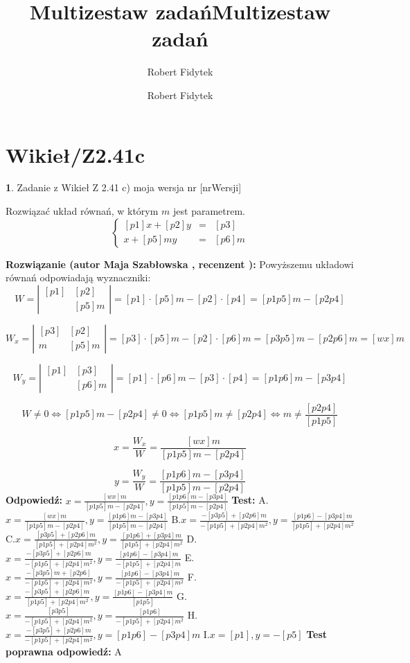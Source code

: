 \documentclass[12pt, a4paper]{article}
\title{Multizestaw zadań}
\author{Robert Fidytek}
\date{}\documentclass[12pt, a4paper]{article}
\title{Multizestaw zadań}
\author{Robert Fidytek}
\date{}
\theoremstyle{definition} %
\newtheorem{zad}{}
\theoremstyle{definition} %
\newtheorem{zad}{}
\newcommand{\kategoria}[1]{\section{#1}} %
\newcommand{\zadStart}[1]{\begin{zad}#1\newline} %
\newcommand{\zadStop}{\end{zad}}   %
\newcommand{\rozwStart}[2]{\noindent \textbf{Rozwiązanie (autor #1 , recenzent #2): }\newline} %
\newcommand{\rozwStop}{\newline}                                            %
\newcommand{\odpStart}{\noindent \textbf{Odpowiedź:}\newline}    %
\newcommand{\odpStop}{\newline}                                             %
\newcommand{\testStart}{\noindent \textbf{Test:}\newline} %
\newcommand{\testStop}{\newline} %
\newcommand{\kluczStart}{\noindent \textbf{Test poprawna odpowiedź:}\newline} %
\newcommand{\kluczStop}{\newline} %
\begin{document}
\maketitle


\kategoria{Wikieł/Z2.41c}
\zadStart{Zadanie z Wikieł Z 2.41 c)  moja wersja nr [nrWersji]}

Rozwiązać układ równań, w którym $m$ jest parametrem.
$$\left\{\begin{array}{ccc}
[p1]x+[p2]y&=&[p3]\\
[p4]x+[p5]my&=&[p6]m
\end{array} \right.$$

\zadStop
\rozwStart{Maja Szabłowska}{}
Powyższemu układowi równań odpowiadają wyznaczniki:
$$W=\left| \begin{array}{lccr} [p1] & [p2] \\ [p4] & [p5]m \end{array}\right| = [p1]\cdot[p5]m - [p2]\cdot[p4]=[p1p5]m-[p2p4]$$

$$W_{x}=\left| \begin{array}{lccr} [p3] & [p2] \\ [p6]m & [p5]m \end{array}\right| = [p3]\cdot[p5]m - [p2]\cdot[p6]m=[p3p5]m-[p2p6]m=[wx]m$$

$$W_{y}=\left| \begin{array}{lccr} [p1] & [p3] \\ [p4] & [p6]m \end{array}\right| = [p1]\cdot[p6]m - [p3]\cdot[p4]=[p1p6]m-[p3p4]$$

$$W\neq 0 \iff [p1p5]m-[p2p4] \neq 0 \iff [p1p5]m\neq[p2p4] \iff
m\neq \frac{[p2p4]}{[p1p5]} $$

$$x=\frac{W_{x}}{W}=\frac{[wx]m}{[p1p5]m-[p2p4]}$$

$$y=\frac{W_{y}}{W}=\frac{[p1p6]m-[p3p4]}{[p1p5]m-[p2p4]}$$
\rozwStop
\odpStart
$x=\frac{[wx]m}{[p1p5]m-[p2p4]}, y=\frac{[p1p6]m-[p3p4]}{[p1p5]m-[p2p4]}$
\odpStop
\testStart
A.$x=\frac{[wx]m}{[p1p5]m-[p2p4]}, y=\frac{[p1p6]m-[p3p4]}{[p1p5]m-[p2p4]}$
B.$x=\frac{-[p3p5]+[p2p6]m}{-[p1p5]+[p2p4]m^{2}}, y=\frac{[p1p6]-[p3p4]m}{[p1p5]+[p2p4]m^{2}}$
C.$x=\frac{[p3p5]+[p2p6]m}{[p1p5]+[p2p4]m^{2}}, y=\frac{[p1p6]+[p3p4]m}{[p1p5]+[p2p4]m^{2}}$
D.$x=\frac{-[p3p5]+[p2p6]m}{-[p1p5]+[p2p4]m^{2}}, y=\frac{[p1p6]-[p3p4]m}{-[p1p5]+[p2p4]m}$
E.$x=\frac{-[p3p5]m+[p2p6]}{-[p1p5]+[p2p4]m^{2}}, y=\frac{[p1p6]-[p3p4]m}{-[p1p5]+[p2p4]m^{2}}$
F.$x=\frac{-[p3p5]+[p2p6]m}{[p1p5]+[p2p4]m^{2}}, y=\frac{[p1p6]-[p3p4]m}{[p1p5]}$
G.$x=\frac{[p3p5]}{-[p1p5]+[p2p4]m^{2}}, y=\frac{[p1p6]}{-[p1p5]+[p2p4]m^{2}}$
H.$x=\frac{-[p3p5]+[p2p6]m}{-[p1p5]+[p2p4]m^{2}}, y=[p1p6]-[p3p4]m$
I.$x=[p1], y=-[p5]$
\testStop
\kluczStart
A
\kluczStop
\end{document}
